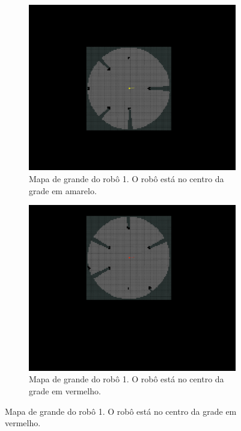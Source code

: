 \begin{figure}[]
  \centering
  \begin{subfigure}{0.45\textwidth}
    \includegraphics[width=\textwidth]{figs/grid-rb1.png}
    \caption{Mapa de grande do robô 1. O robô está no centro da grade 
      em amarelo.}
  \end{subfigure}
  \hfill
  \begin{subfigure}{0.45\textwidth}
    \includegraphics[width=\textwidth]{figs/grid-rb2.png}
    \caption{Mapa de grande do robô 1. O robô está no centro da grade 
      em vermelho.}

\end{subfigure}
\end{figure}
